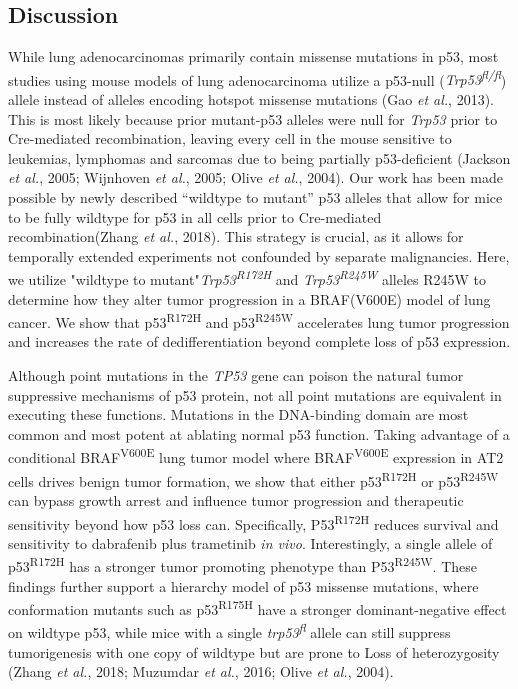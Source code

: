 \hypertarget{discussion-1}{%
\subsection{Discussion}\label{discussion-1}}

While lung adenocarcinomas primarily contain missense mutations in p53, most studies using mouse models of lung adenocarcinoma utilize a p53-null (\emph{Trp53\textsuperscript{fl/fl}}) allele instead of alleles encoding hotspot missense mutations (Gao \emph{et al.}, 2013). This is most likely because prior mutant-p53 alleles were null for \emph{Trp53} prior to Cre-mediated recombination, leaving every cell in the mouse sensitive to leukemias, lymphomas and sarcomas due to being partially p53-deficient (Jackson \emph{et al.}, 2005; Wijnhoven \emph{et al.}, 2005; Olive \emph{et al.}, 2004). Our work has been made possible by newly described ``wildtype to mutant'' p53 alleles that allow for mice to be fully wildtype for p53 in all cells prior to Cre-mediated recombination(Zhang \emph{et al.}, 2018). This strategy is crucial, as it allows for temporally extended experiments not confounded by separate malignancies. Here, we utilize "wildtype to mutant"\emph{Trp53\textsuperscript{R172H}} and \emph{Trp53\textsuperscript{R245W}} alleles R245W to determine how they alter tumor progression in a BRAF(V600E) model of lung cancer. We show that p53\textsuperscript{R172H} and p53\textsuperscript{R245W} accelerates lung tumor progression and increases the rate of dedifferentiation beyond complete loss of p53 expression.

Although point mutations in the \emph{TP53} gene can poison the natural tumor suppressive mechanisms of p53 protein, not all point mutations are equivalent in executing these functions. Mutations in the DNA-binding domain are most common and most potent at ablating normal p53 function. Taking advantage of a conditional BRAF\textsuperscript{V600E} lung tumor model where BRAF\textsuperscript{V600E} expression in AT2 cells drives benign tumor formation, we show that either p53\textsuperscript{R172H} or p53\textsuperscript{R245W} can bypass growth arrest and influence tumor progression and therapeutic sensitivity beyond how p53 loss can. Specifically, P53\textsuperscript{R172H} reduces survival and sensitivity to dabrafenib plus trametinib \emph{in vivo}. Interestingly, a single allele of p53\textsuperscript{R172H} has a stronger tumor promoting phenotype than P53\textsuperscript{R245W}. These findings further support a hierarchy model of p53 missense mutations, where conformation mutants such as p53\textsuperscript{R175H} have a stronger dominant-negative effect on wildtype p53, while mice with a single \emph{trp53\textsuperscript{fl}} allele can still suppress tumorigenesis with one copy of wildtype but are prone to Loss of heterozygosity (Zhang \emph{et al.}, 2018; Muzumdar \emph{et al.}, 2016; Olive \emph{et al.}, 2004).


